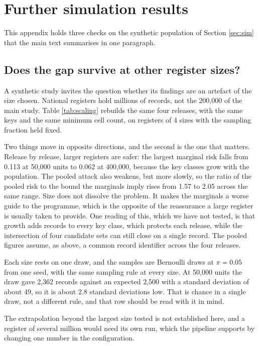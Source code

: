 \documentclass[11pt,a4paper]{article}
\theoremstyle{plain}
\theoremstyle{definition}
\theoremstyle{definition}
\theoremstyle{plain}
\begin{document}
\section{Further simulation results}\label{app:further}

This appendix holds three checks on the synthetic population of Section
\ref{sec:sim} that the main text summarises in one paragraph.

\subsection{Does the gap survive at other register sizes?}\label{sec:scaling}

A synthetic study invites the question whether its findings are an artefact of
the size chosen. National registers hold millions of records, not the
200{,}000 of the main study. Table \ref{tab:scaling} rebuilds the same four
releases, with the same keys and the same minimum cell count, on registers of
4 sizes with the sampling fraction held fixed.



Two things move in opposite directions, and the second is the one that matters.
Release by release, larger registers are safer: the largest marginal risk falls
from 0.113 at 50{,}000 units to
0.062 at 400{,}000, because the key classes grow
with the population. The pooled attack also weakens, but more slowly, so the
ratio of the pooled risk to the bound the marginals imply rises from
1.57 to 2.05 across the same range. Size does not
dissolve the problem. It makes the marginals a worse guide to the programme,
which is the opposite of the reassurance a large register is usually taken to
provide. One reading of this, which we have not tested, is that growth adds
records to every key class, which protects each release, while the intersection
of four candidate sets can still close on a single record. The pooled figures
assume, as above, a common record identifier across the four releases.

Each size rests on one draw, and the samples are Bernoulli draws at $\pi = 0.05$
from one seed, with the same sampling rule at every size. At 50{,}000 units the
draw gave 2{,}362 records against an expected 2{,}500 with a standard deviation
of about 49, so it is about 2.8 standard deviations low. That is chance in a
single draw, not a different rule, and that row should be read with it in mind.

The extrapolation beyond the largest size tested is not established here, and a
register of several million would need its own run, which the pipeline supports
by changing one number in the configuration.
\end{document}
